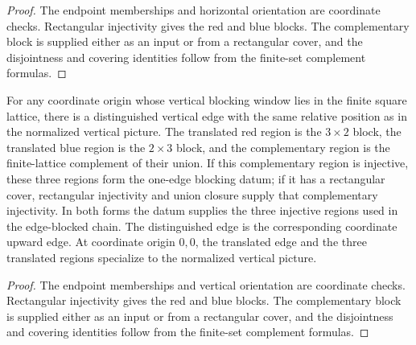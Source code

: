 \begin{proof}\leanok
    The endpoint memberships and horizontal orientation are coordinate
    checks. Rectangular injectivity gives the red and blue blocks. The
    complementary block is supplied either as an input or from a rectangular
    cover, and the disjointness and covering identities follow from the
    finite-set complement formulas.
\end{proof}

\begin{lemma}%
    \label{lem:peps_normalSquareVerticalTranslatedEdge_blockingData}
    \leanok
    For any coordinate origin whose vertical blocking window lies in the
    finite square lattice, there is a distinguished vertical edge with the same
    relative position as in the normalized vertical picture. The translated
    red region is the $3\times2$ block, the translated blue region is the
    $2\times3$ block, and the complementary region is the finite-lattice
    complement of their union. If this complementary region is injective,
    these three regions form the one-edge blocking datum; if it has a
    rectangular cover, rectangular injectivity and union closure supply that
    complementary injectivity. In both forms the datum supplies the three
    injective regions used in the edge-blocked chain. The distinguished edge
    is the corresponding coordinate upward edge. At coordinate origin $0,0$,
    the translated edge and the three translated regions specialize to the
    normalized vertical picture.
\end{lemma}
\begin{proof}\leanok
    The endpoint memberships and vertical orientation are coordinate checks.
    Rectangular injectivity gives the red and blue blocks. The complementary
    block is supplied either as an input or from a rectangular cover, and the
    disjointness and covering identities follow from the finite-set complement
    formulas.
\end{proof}

